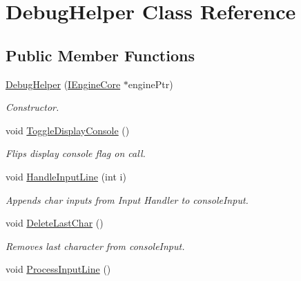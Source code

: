 \hypertarget{class_debug_helper}{\section{Debug\+Helper Class Reference}
\label{class_debug_helper}
}
\subsection*{Public Member Functions}
\begin{DoxyCompactItemize}
\item 
\hypertarget{class_debug_helper_a29d4ff680c7d62a0d291f910b18c726d}{\hyperlink{class_debug_helper_a29d4ff680c7d62a0d291f910b18c726d}{Debug\+Helper} (\hyperlink{class_i_engine_core}{I\+Engine\+Core} $\ast$engine\+Ptr)}\label{class_debug_helper_a29d4ff680c7d62a0d291f910b18c726d}

\begin{DoxyCompactList}\small\item\em Constructor. \end{DoxyCompactList}\item 
\hypertarget{class_debug_helper_a43b172bef6f51e3a6107438c58050c28}{void \hyperlink{class_debug_helper_a43b172bef6f51e3a6107438c58050c28}{Toggle\+Display\+Console} ()}\label{class_debug_helper_a43b172bef6f51e3a6107438c58050c28}

\begin{DoxyCompactList}\small\item\em Flips display console flag on call. \end{DoxyCompactList}\item 
\hypertarget{class_debug_helper_af65921d69c5e05bedb84ddd3b961a7fa}{void \hyperlink{class_debug_helper_af65921d69c5e05bedb84ddd3b961a7fa}{Handle\+Input\+Line} (int i)}\label{class_debug_helper_af65921d69c5e05bedb84ddd3b961a7fa}

\begin{DoxyCompactList}\small\item\em Appends char inputs from Input Handler to console\+Input. \end{DoxyCompactList}\item 
\hypertarget{class_debug_helper_a280c80f783830b516fc2cfe3c48646c9}{void \hyperlink{class_debug_helper_a280c80f783830b516fc2cfe3c48646c9}{Delete\+Last\+Char} ()}\label{class_debug_helper_a280c80f783830b516fc2cfe3c48646c9}

\begin{DoxyCompactList}\small\item\em Removes last character from console\+Input. \end{DoxyCompactList}\item 
\hypertarget{class_debug_helper_a1a58402827749bbe28318387936de404}{void \hyperlink{class_debug_helper_a1a58402827749bbe28318387936de404}{Process\+Input\+Line} ()}\label{class_debug_helper_a1a58402827749bbe28318387936de404}


\end{DoxyCompactItemize}
